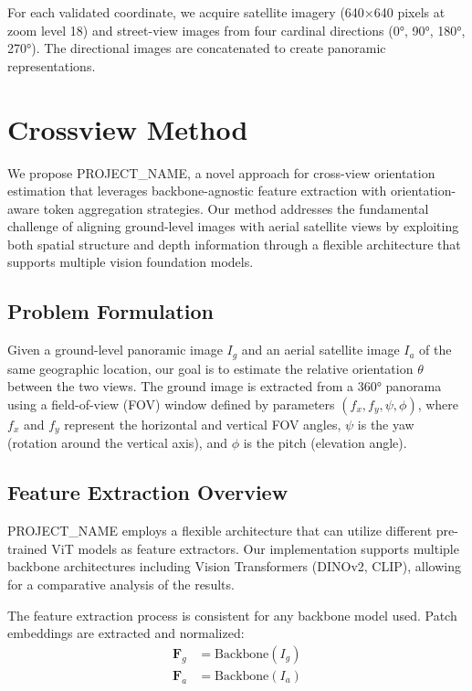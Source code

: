 \documentclass{bmvc2k}
\begin{document}
For each validated coordinate, we acquire satellite imagery (640×640 pixels at zoom level 18) and street-view images from four cardinal directions (0°, 90°, 180°, 270°). The directional images are concatenated to create panoramic representations.

\section{Crossview Method}
\label{sec:method}

We propose PROJECT\_NAME, a novel approach for cross-view orientation estimation that leverages backbone-agnostic feature extraction with orientation-aware token aggregation strategies. Our method addresses the fundamental challenge of aligning ground-level images with aerial satellite views by exploiting both spatial structure and depth information through a flexible architecture that supports multiple vision foundation models.

\subsection{Problem Formulation}

Given a ground-level panoramic image $I_g$ and an aerial satellite image $I_a$ of the same geographic location, our goal is to estimate the relative orientation $\theta$ between the two views. The ground image is extracted from a 360° panorama using a field-of-view (FOV) window defined by parameters $(f_x, f_y, \psi, \phi)$, where $f_x$ and $f_y$ represent the horizontal and vertical FOV angles, $\psi$ is the yaw (rotation around the vertical axis), and $\phi$ is the pitch (elevation angle).

\newpage
\subsection{Feature Extraction Overview}

PROJECT\_NAME employs a flexible architecture that can utilize different pre-trained ViT models as feature extractors. Our implementation supports multiple backbone architectures including Vision Transformers (DINOv2, CLIP), allowing for a comparative analysis of the results.

The feature extraction process is consistent for any backbone model used. Patch embeddings are extracted and normalized:
\begin{align}
\mathbf{F}_g &= \text{Backbone}(I_g) \\
\mathbf{F}_a &= \text{Backbone}(I_a) 
\end{align}
\end{document}
